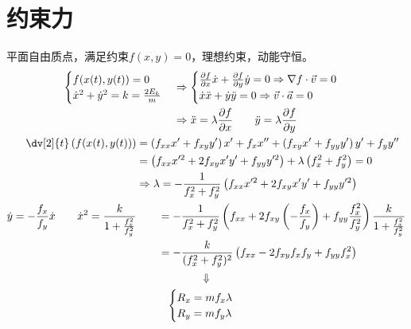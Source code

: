 \documentclass[12pt, a4paper, oneside, UTF8]{ctexbook}  %
\newcommand{\pa}{\partial}
\begin{document}
\section{约束力}
\begin{example}
    平面自由质点，满足约束\(f(x,y)=0\)，理想约束，动能守恒。
    \begin{gather*}
\begin{aligned}
    \begin{cases}
        f(x(t),y(t))=0\\
        \dot{x}^2+\dot{y}^2=k=\frac{2E_k}{m}
    \end{cases}&\Rightarrow
\begin{cases}
\frac{\pa f}{\pa x}\dot{x}+\frac{\pa f}{\pa y}\dot{y}=0
\Rightarrow\nabla f\cdot\vec{v}=0\\
\dot{x}\ddot{x}+\dot{y}\ddot{y}=0
\Rightarrow\vec{v}\cdot\vec{a}=0
\end{cases}\\&
\Rightarrow
\ddot{x}=\lambda\frac{\pa f}{\pa x}\qquad 
\ddot{y}=\lambda\frac{\pa f}{\pa y}\\
\end{aligned}\\
\begin{aligned}
    \dv[2]{t}\left(f(x(t),y(t))\right)
&=\left(f_{xx}x'+f_{xy}y'\right)x'+f_x x''
+\left(f_{xy}x'+f_{yy}y'\right)y'+f_y y''
\\&=\left(f_{xx}x'^2+2f_{xy}x'y'+f_{yy}y'^2\right)
+\lambda\left(f_x^2+f_y^2\right)=0
\\&\Rightarrow\lambda=-\frac{1}{f_x^2+f_y^2}
\left(f_{xx}x'^2+2f_{xy}x'y'+f_{yy}y'^2\right)\\
\dot{y}=-\frac{f_x}{f_y}\dot{x}
\qquad\dot{x}^2=\frac{k}{1+\frac{f_x^2}{f_y^2}}
&\qquad=-\frac{1}{f_x^2+f_y^2}\left(f_{xx}+2f_{xy}\left(-\frac{f_x}{f_y}\right)
+f_{yy}\frac{f_x^2}{f_y^2}\right)\frac{k}{1+\frac{f_x^2}{f_y^2}}\\
&\qquad=-\frac{k}{(f_x^2+f_y^2)^2}
\left(f_{xx}-2f_{xy}f_xf_y+f_{yy}f_x^2\right)
\end{aligned}\\
\Downarrow\\
\begin{cases}
    R_x=mf_x \lambda\\
    R_y=mf_y \lambda
\end{cases}
    \end{gather*}
\end{example}
\end{document}
